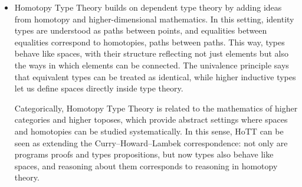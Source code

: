 \begin{itemize}
  \begin{definition}
    Given a category $\mathcal{C}$ and an object $A \in \mathcal{C}$, the slice category $\mathcal{C}/A$ is defined as follows:
    \begin{itemize}
    \item Objects are morphisms $f : X \to A$ in $\mathcal{C}$.
    \item Morphisms from $f : X \to A$ to $g : Y \to A$ are arrows $h : X \to Y$ in $\mathcal{C}$ such that $g \circ h = f$.
    \end{itemize}
  \end{definition}

  \noindent
  Intuitively, objects of $\mathcal{C}/A$ represent families of objects indexed by elements of $A$. For example, in $\mathbf{Set}$, an object of $\mathbf{Set}/A$ is a function $X \to A$, which can be understood as an $A$-indexed family of sets. This matches the intuition of a dependent type: a type that may vary depending on the term of type $A$ we are given.

  \begin{definition}
    A category $\mathcal{C}$ is called locally cartesian closed category if every slice category $\mathcal{C}/A$ is cartesian closed for all objects $A \in \mathcal{C}$.
  \end{definition}
  This extra structure means that not only do we have function spaces globally as in CCCs, but also relative function spaces within each context $A$. In type theory, this corresponds exactly to dependent function $\Pi$-types.

\item Homotopy Type Theory builds on dependent type theory by adding ideas from homotopy and higher-dimensional mathematics. In this setting, identity types are understood as paths between points, and equalities between equalities correspond to homotopies, paths between paths. This way, types behave like spaces, with their structure reflecting not just elements but also the ways in which elements can be connected. The univalence principle says that equivalent types can be treated as identical, while higher inductive types let us define spaces directly inside type theory.

  Categorically, Homotopy Type Theory is related to the mathematics of higher categories and higher toposes, which provide abstract settings where spaces and homotopies can be studied systematically. In this sense, HoTT can be seen as extending the Curry--Howard--Lambek correspondence: not only are programs proofs and types propositions, but now types also behave like spaces, and reasoning about them corresponds to reasoning in homotopy theory.
\end{itemize}

